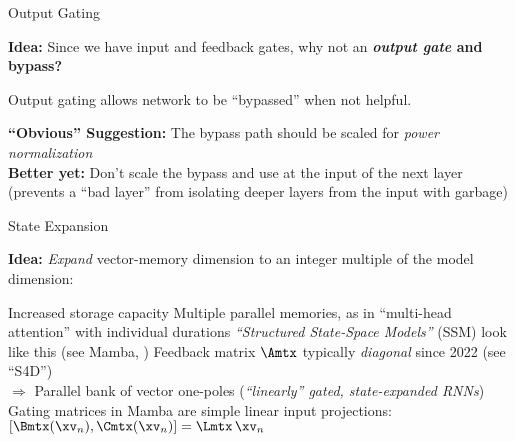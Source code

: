 \begin{slide}[\slideopts,toc={Skip Connection}]{Output Gating}

  \vspace{-1em}

  \textbf{Idea:} Since we have input and feedback gates, why not an \textbf{\emph{output gate} and bypass?}


\maybepause
Output gating allows network to be ``bypassed'' when not helpful.

\begin{itemize}
\mpitem \textbf{``Obvious'' Suggestion:} The bypass path should be scaled for \emph{power normalization}\\
\mpitem \textbf{Better yet:} Don't scale the bypass and use  at the input of the next layer\\
(prevents a ``bad layer'' from isolating deeper layers from the input with garbage)
\end{itemize}

\end{slide}

\begin{slide}[\slideopts]{State Expansion}

\vspace{-1em}

  \textbf{Idea:} \emph{Expand} vector-memory dimension to an integer multiple of the model dimension:
%


\vspace{-2em}

\begin{itemize}
  \mpitem Increased storage capacity
  \mpitem Multiple parallel memories, as in ``multi-head attention'' with individual durations
  \mpitem \emph{``Structured State-Space Models''} (SSM) look like this (see Mamba, \eg)
  \mpitem Feedback matrix $\Amtx$ typically \emph{diagonal} since 2022 (see ``S4D'')\\
  	  $\Rightarrow$ Parallel bank of vector one-poles (\emph{``linearly'' gated, state-expanded RNNs})
  \mpitem Gating matrices in Mamba are simple linear input projections: 
  $
          [\Bmtx(\xv_n), \Cmtx(\xv_n)] = \Lmtx\,\xv_n  %
  $
\end{itemize}

\end{slide}

